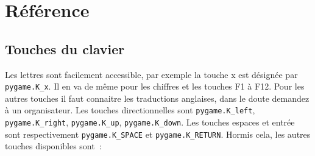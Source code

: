 \section{Référence}
\label{sec:reference}

\subsection{Touches du clavier}
\label{sec:refclavier}
Les lettres sont facilement accessible, par exemple la touche x est désignée par \texttt{pygame.K\_x}.
Il en va de même pour les chiffres et les touches F1 à F12.
Pour les autres touches il faut connaitre les traductions anglaises, dans le doute demandez à un organisateur.
Les touches directionnelles sont \texttt{pygame.K\_left}, \texttt{pygame.K\_right}, \texttt{pygame.K\_up}, \texttt{pygame.K\_down}.
Les touches espaces et entrée sont respectivement \texttt{pygame.K\_SPACE} et \texttt{pygame.K\_RETURN}.
Hormis cela, les autres touches disponibles sont~:
